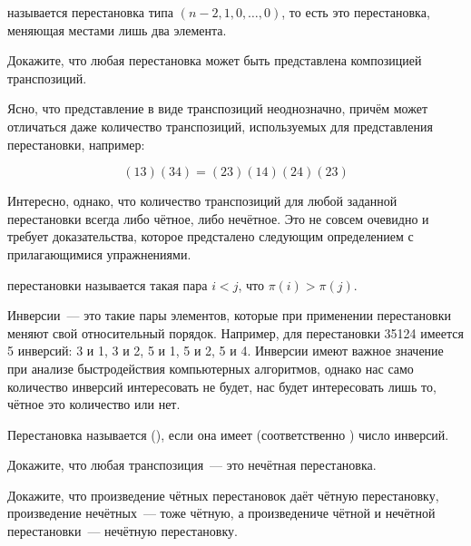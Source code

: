 \begin{definition}
 называется перестановка типа $(n-2, 1, 0, \ldots, 0)$, то есть это перестановка, меняющая местами лишь два элемента.
\end{definition}

\begin{exercise}
Докажите, что любая перестановка может быть представлена композицией транспозиций.
\end{exercise}

Ясно, что представление в виде транспозиций неоднозначно, причём может отличаться даже количество транспозиций, используемых для представления перестановки, например:

$$(13)(34) = (23)(14)(24)(23)$$

Интересно, однако, что количество транспозиций для любой заданной перестановки всегда либо чётное, либо нечётное. Это не совсем очевидно и требует доказательства, которое предсталено следующим определением с прилагающимися упражнениями.

\begin{definition}
 перестановки называется такая пара $i<j$, что $\pi(i) > \pi(j)$.
\end{definition}

Инверсии~— это такие пары элементов, которые при применении перестановки меняют свой относительный порядок. Например, для перестановки 35124 имеется 5 инверсий: 3 и 1, 3 и 2, 5 и 1, 5 и 2, 5 и 4. Инверсии имеют важное значение при анализе быстродействия компьютерных алгоритмов, однако нас само количество инверсий интересовать не будет, нас будет интересовать лишь то, чётное это количество или нет.

\begin{definition}
Перестановка называется  (), если она имеет  (соответственно ) число инверсий.
\end{definition}

\begin{exercise}
Докажите, что любая транспозиция~— это нечётная перестановка.
\end{exercise}

\begin{exercise}
Докажите, что произведение чётных перестановок даёт чётную перестановку, произведение нечётных~— тоже чётную, а произведениче чётной и нечётной перестановки~— нечётную перестановку.
\end{exercise}

